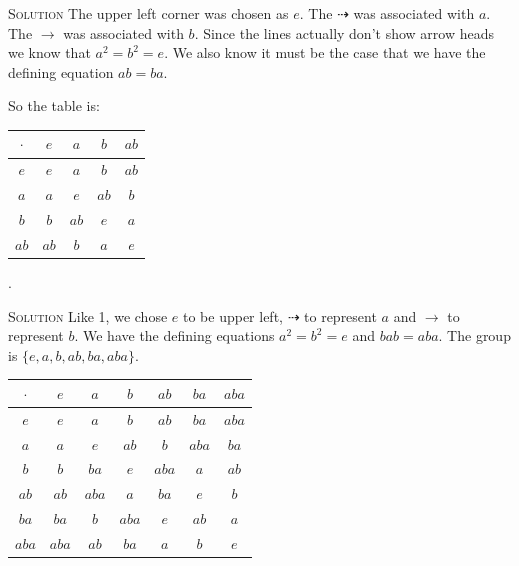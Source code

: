 \documentclass[twoside]{amsart}
\newcommand{\solution}{\textsc{Solution}\xspace}
\begin{document}
\begin{enumerate}[A.]
    \noindent \solution The upper left corner
    was chosen as $e$. The $\dashrightarrow$ was associated with $a$. The
    $\to$ was associated with $b$. Since the lines actually don't show
    arrow heads we know that $a^2=b^2=e$. We also know it must
    be the case that we have the defining equation $ab=ba$.

    So the table is:
    \begin{center}
    \begin{tabular}{c|cccc}
       $\cdot$ & $e$ & $a$ & $b$ & $ab$ \\ \hline
       $e$     & $e$ & $a$ & $b$ & $ab$ \\
       $a$     & $a$ & $e$ & $ab$ & $b$ \\
       $b$     & $b$ & $ab$ & $e$ & $a$ \\
       $ab$    & $ab$ & $b$ & $a$ & $e$
    \end{tabular}
    \end{center}

    . 

    \noindent \solution Like 1, we chose $e$ to be upper left,
    $\dashrightarrow$ to represent $a$ and $\to$ to represent $b$.
    We have the defining equations $a^2=b^2=e$ and $bab=aba$. The
    group is $\{e,a,b,ab,ba,aba\}$.
    \begin{center}
    \begin{tabular}{c|cccccc}
    $\cdot$ & $e$ & $a$ & $b$ & $ab$ & $ba$ & $aba$ \\ \hline
    $e$     & $e$ & $a$ & $b$ & $ab$ & $ba$ & $aba$ \\ 
    $a$     & $a$ & $e$ & $ab$ & $b$ & $aba$ & $ba$ \\
    $b$     & $b$ & $ba$ & $e$ & $aba$ & $a$ & $ab$ \\
    $ab$    & $ab$ & $aba$ & $a$ & $ba$ & $e$ & $b$ \\
    $ba$    & $ba$ & $b$ & $aba$ & $e$ & $ab$ & $a$ \\
    $aba$   & $aba$ & $ab$ & $ba$ & $a$ & $b$ & $e$
    \end{tabular}
    \end{center}








\end{enumerate}
\end{document}
